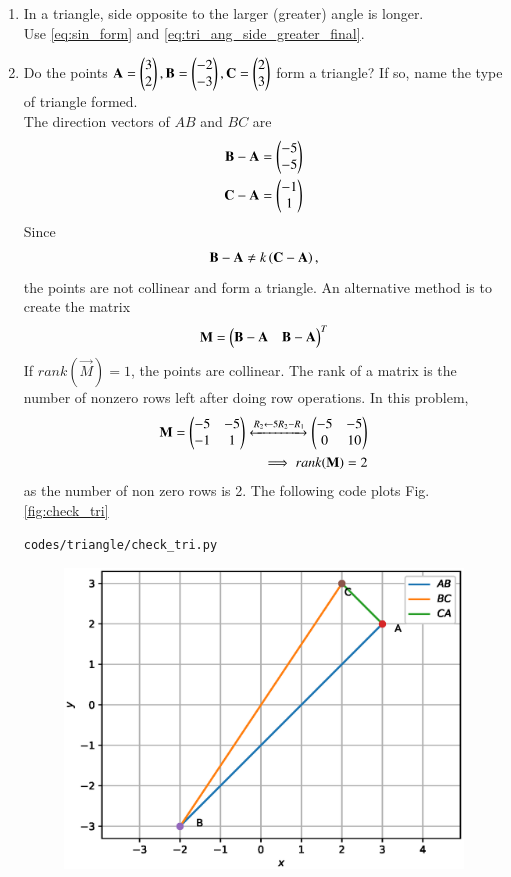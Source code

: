 \begin{enumerate}[label=\arabic*.,ref=\thesubsection.\theenumi]
\item In a triangle, side opposite to the larger (greater) angle is longer. 
%
\\
\solution Use \eqref{eq:sin_form} and \eqref{eq:tri_ang_side_greater_final}.
\item Do the points $\mathbf{A}=\begin{pmatrix}3\\2\end{pmatrix}, \mathbf{B}=\begin{pmatrix}-2\\-3\end{pmatrix}, \mathbf{C}=\begin{pmatrix}2\\3\end{pmatrix} $ form a triangle?  If so, name the type of triangle formed.
\label{prob:tri_exam_coll_pts}
%
\\
\solution The direction vectors of $AB$ and $BC$ are 
\begin{align}
\label{eq:tri_geo_ex_baorth}
\mathbf{B}-\mathbf{A} &= \begin{pmatrix}-5\\-5\end{pmatrix}
\\
\mathbf{C}-\mathbf{A} &= \begin{pmatrix}-1\\1\end{pmatrix}
\label{eq:tri_geo_ex_caorth}
\end{align}
%
Since 
%
\begin{align}
\mathbf{B}-\mathbf{A} \ne k\left(\mathbf{C}-\mathbf{A}\right),
\end{align}
%
the points are not collinear and form a triangle.  An alternative method is to create the matrix
\begin{align}
\label{eq:tri_geo_ex_diff_mat}
\mathbf{M} = \begin{pmatrix}\mathbf{B}-\mathbf{A} & \mathbf{B}-\mathbf{A}\end{pmatrix}^T 
\end{align}
%
If $rank(\vec{M}) = 1$, the points are collinear.  The rank of a matrix is the number of nonzero rows left after doing row operations.  In this problem, 
%
\begin{align}
\mathbf{M} = \begin{pmatrix}-5 & -5\\-1 & 1\end{pmatrix}\xleftrightarrow {R_2\leftarrow 5R_2-R_1}\begin{pmatrix}-5 & -5\\0 & 10\end{pmatrix}
\\
\implies rank(\mathbf{M}) = 2
\end{align}
%
as the number of non zero rows is 2.
The following code plots Fig. \ref{fig:check_tri}
%
\begin{lstlisting}
codes/triangle/check_tri.py
\end{lstlisting}
%
\begin{figure}[!ht]
\includegraphics[width=\columnwidth]{./triangle/figs/check_tri.eps}

\end{figure}
\end{enumerate}
